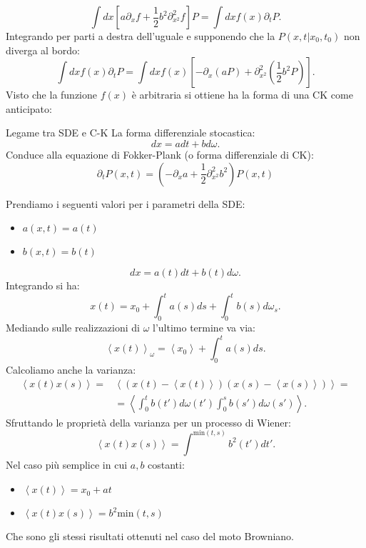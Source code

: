 \[
    \int dx \left[a \partial_{x}f +\frac{1}{2}b^2\partial^2_{x^2}f\right]P = \int dx f(x) \partial_{t}P 
.\] 
Integrando per parti a destra dell'uguale e supponendo che la $P\left(x,t|x_0,t_0\right)$ non diverga al bordo:
\[
    \int dx f(x) \partial_{t}P = 
    \int dx f(x) \left[-\partial_{x}(aP) + \partial^2_{x^2}\left(\frac{1}{2}b^2P\right)\right]
.\] 
Visto che la funzione $f(x)$ è arbitraria si ottiene ha la forma di una CK come anticipato:
\begin{redbox}{Legame tra SDE e C-K}
    La forma differenziale stocastica:
    \[
    dx = adt + bd\omega
    .\] 
    Conduce alla equazione di Fokker-Plank (o forma differenziale di CK):
    \begin{equation}
    \partial_{t}P(x,t) = \left(-\partial_{x}a + \frac{1}{2}\partial^2_{x^2}b^2\right)P(x,t) 
    \label{eq:8_CK-SDE}
    \end{equation}
\end{redbox}
\noindent
\begin{exmp}[]
    Prendiamo i seguenti valori per i parametri della SDE:
    \begin{itemize}
        \item $a(x,t) = a(t)$
	\item $b(x,t) = b(t)$
    \end{itemize}
    \[
	dx = a(t)dt + b(t) d\omega
    .\] 
    Integrando si ha: 
    \[
	x(t) = x_0 + \int_{0}^{t} a(s) ds + \int_{0}^{t} b(s) d\omega_s 
    .\] 
    Mediando sulle realizzazioni di $\omega$ l'ultimo termine va via:
    \[
	\left<x(t) \right>_\omega = \left<x_0\right>+\int_{0}^{t} a(s) ds 
    .\] 
    Calcoliamo anche la varianza:
    \[\begin{aligned}
	\left<x(t) x(s) \right> =& \left<\left(x(t) - \left<x(t)\right>\right)\left(x(s) - \left<x(s)\right>\right)\right> = \\
				 & = \left<\int_{0}^{t} b(t') d\omega(t') \int_{0}^{s} b(s') d\omega (s')\right>
    .\end{aligned}\]
    Sfruttando le proprietà della varianza per un processo di Wiener:
    \[
	\left<x(t) x(s) \right> = \int_{}^{\text{min}(t,s)} b^2(t') dt'
    .\] 
    Nel caso più semplice in cui $a, b$ costanti:
    \begin{itemize}
	\item $\left<x(t)\right>=x_0+at$ 
	\item $\left<x(t) x(s)\right> = b^2 \text{min}(t,s)$ 
    \end{itemize}
    Che sono gli stessi risultati ottenuti nel caso del moto Browniano.
\end{exmp}
